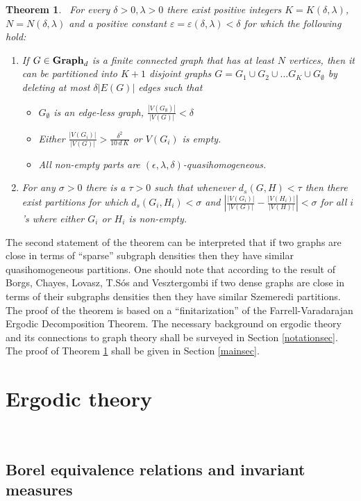 \documentclass{article}
\newtheorem{theorem}{Theorem}
\newcommand{\ep}{\varepsilon}
\newcommand{\de}{\delta}
\newcommand{\Gd}[1][d]{\textrm{\textbf{Graph}}_{#1}}
\begin{document}
\begin{theorem}~\label{mainthm}
For every $\delta>0,\lambda>0$ 
there exist positive integers $K
= K(\de,\lambda)$, $N = N(\de,\lambda)$ and a positive
constant $\ep=\ep(\delta,\lambda)<\delta$
for 
which the following hold: 
\begin{enumerate}\item
If $G\in \Gd$ is a finite connected graph that
has at least $N$ vertices, then it can be partitioned into $K+1$
disjoint graphs $G=G_1\cup G_2\cup\dots G_K\cup G_{\emptyset}$
by deleting at most $\de |E(G)|$ edges such that
\begin{itemize}
\item $G_{\emptyset}$ is an edge-less graph, $\frac{|V(G_\emptyset)|}
{|V(G)|}<\de$
\item Either $\frac{|V(G_i)|}
{|V(G)|}>\frac{\delta^2}{10\,d\,K}$ or $V(G_i)$ is empty.
\item All non-empty parts are $(\epsilon,\lambda,\delta)$-quasihomogeneous.
\end{itemize}
\item For any $\sigma > 0$ there is a $\tau > 0$ such that whenever
  $d_s(G,H) < \tau$ then there exist partitions for which
  $d_s(G_i,H_i) < \sigma$ and $\left|\frac{|V(G_i)|}{|V(G)|} - \frac{|V(H_i)|}
{|V(H)|}\right| < \sigma$ for all $i$'s where either $G_i$ or $H_i$ is
  non-empty.
\end{enumerate}
\end{theorem}
The second statement of the theorem can be interpreted that if two graphs
are close in terms of ``sparse'' subgraph densities then they
have similar quasihomogeneous partitions. One should note that according to
the result of Borgs, Chayes, Lovasz, T.S\'os and Vesztergombi \cite{BCh2}
if two dense graphs are close in terms of their subgraphs densities
then they have similar Szemeredi partitions.
\noindent
The proof of the theorem is based on a ``finitarization'' of the
Farrell-Varadarajan Ergodic Decomposition Theorem. The necessary background
on ergodic theory and its connections to graph theory shall be surveyed
in Section \ref{notationsec}. 
The proof of Theorem \ref{mainthm} shall be given
in Section \ref{mainsec}.


\section{Ergodic theory}~\label{notationsec}
\subsection{Borel equivalence relations
 and invariant measures}~\label{ergodicsec}
\end{document}
